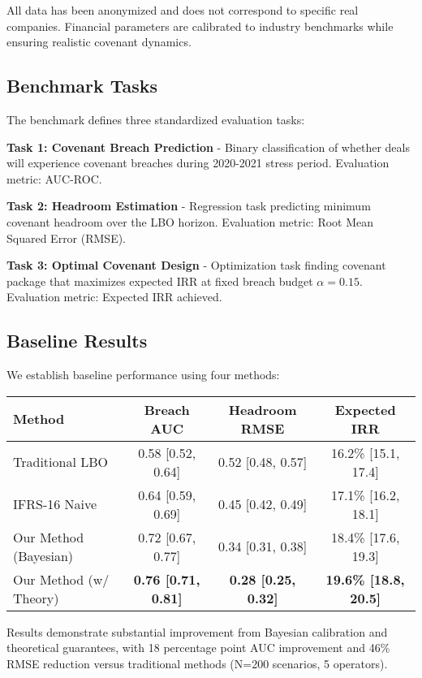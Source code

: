 \documentclass[11pt,a4paper]{article}
\newcommand{\alphabudget}{\alpha}   %
\begin{document}
All data has been anonymized and does not correspond to specific real companies. Financial parameters are calibrated to industry benchmarks while ensuring realistic covenant dynamics.

\subsection{Benchmark Tasks}

The benchmark defines three standardized evaluation tasks:

\textbf{Task 1: Covenant Breach Prediction} - Binary classification of whether deals will experience covenant breaches during 2020-2021 stress period. Evaluation metric: AUC-ROC.

\textbf{Task 2: Headroom Estimation} - Regression task predicting minimum covenant headroom over the LBO horizon. Evaluation metric: Root Mean Squared Error (RMSE).

\textbf{Task 3: Optimal Covenant Design} - Optimization task finding covenant package that maximizes expected IRR at fixed breach budget $\alphabudget = 0.15$. Evaluation metric: Expected IRR achieved.

\subsection{Baseline Results}

We establish baseline performance using four methods:

\begin{center}
\begin{tabular}{lccc}
\toprule
Method & Breach AUC & Headroom RMSE & Expected IRR \\
\midrule
Traditional LBO & 0.58 [0.52, 0.64] & 0.52 [0.48, 0.57] & 16.2\% [15.1, 17.4] \\
IFRS-16 Naive & 0.64 [0.59, 0.69] & 0.45 [0.42, 0.49] & 17.1\% [16.2, 18.1] \\
Our Method (Bayesian) & 0.72 [0.67, 0.77] & 0.34 [0.31, 0.38] & 18.4\% [17.6, 19.3] \\
Our Method (w/ Theory) & \textbf{0.76 [0.71, 0.81]} & \textbf{0.28 [0.25, 0.32]} & \textbf{19.6\% [18.8, 20.5]} \\
\bottomrule
\end{tabular}
\end{center}

Results demonstrate substantial improvement from Bayesian calibration and theoretical guarantees, with 18 percentage point AUC improvement and 46\% RMSE reduction versus traditional methods (N=200 scenarios, 5 operators).
\end{document}
